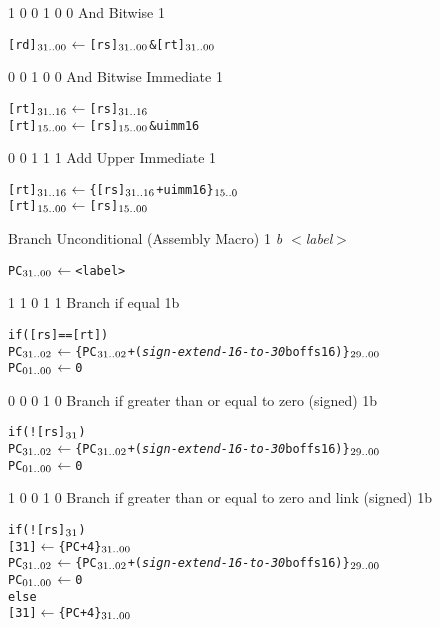    {1 0 0 1 0 0}     {And Bitwise}                   {1}    {\MIPSTag}
\begin{alltt}
        [rd]\({\sb{31..00}}\) \(\leftarrow\) [rs]\({\sb{31..00}}\) & [rt]\({\sb{31..00}}\)
\end{alltt}\rawInstrEnd

    {0 0 1 0 0}    {And Bitwise Immediate}        {1}    {\MIPSTag}
\begin{alltt}
        [rt]\({\sb{31..16}}\) \(\leftarrow\) [rs]\({\sb{31..16}}\)
        [rt]\({\sb{15..00}}\) \(\leftarrow\) [rs]\({\sb{15..00}}\) & uimm16
\end{alltt}\rawInstrEnd

    {0 0 1 1 1}    {Add Upper Immediate}           {1}    {\RawTag}
\begin{alltt}
        [rt]\({\sb{31..16}}\) \(\leftarrow\) \{ [rs]\({\sb{31..16}}\) + uimm16 \}\(\sb{15..0}\)
        [rt]\({\sb{15..00}}\) \(\leftarrow\) [rs]\({\sb{15..00}}\)
\end{alltt}\rawInstrEnd

 {Branch Unconditional (Assembly Macro)} {1} {\RawTag} {{\em b $<$label$>$ }}
\begin{alltt}
        PC\({\sb{31..00}}\) \(\leftarrow\) <label>
\end{alltt}\rawInstrEnd

     {1 1 0 1 1} {Branch if equal}                   {1b}   {\RawTag}
\begin{alltt}
        if ([rs] == [rt])
           PC\({\sb{31..02}}\) \(\leftarrow\) \{ PC\({\sb{31..02}}\) + ({\em{sign-extend-16-to-30}} boffs16) \}\(\sb{29..00}\)
           PC\({\sb{01..00}}\) \(\leftarrow\) 0
\end{alltt}\rawInstrEnd

     {0 0 0 1 0} {Branch if greater than or equal to zero (signed)}    {1b}   {\RawTag}
\begin{alltt}
        if (![rs]\(\sb{31}\))
           PC\({\sb{31..02}}\) \(\leftarrow\) \{ PC\({\sb{31..02}}\) + ({\em{sign-extend-16-to-30}} boffs16) \}\(\sb{29..00}\)
           PC\({\sb{01..00}}\) \(\leftarrow\) 0
\end{alltt}\rawInstrEnd

     {1 0 0 1 0} {Branch if greater than or equal to zero and link (signed)}    {1b}   {\RawTag}
\begin{alltt}
        if (![rs]\(\sb{31}\))
           [31]   \(\leftarrow\) \{ PC + 4 \}\(\sb{31..00}\)
           PC\({\sb{31..02}}\) \(\leftarrow\) \{ PC\({\sb{31..02}}\) + ({\em{sign-extend-16-to-30}} boffs16) \}\(\sb{29..00}\)
           PC\({\sb{01..00}}\) \(\leftarrow\) 0
        else
           [31]   \(\leftarrow\) \{ PC + 4 \}\(\sb{31..00}\)
\end{alltt}\rawInstrEnd

